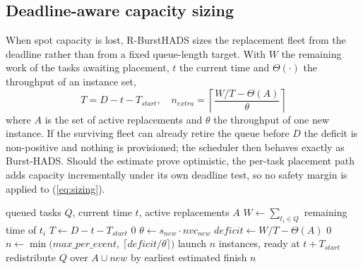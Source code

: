 \documentclass[conference]{IEEEtran}
\begin{document}
\subsection{Deadline-aware capacity sizing}

When spot capacity is lost, R-BurstHADS sizes the replacement fleet from the
deadline rather than from a fixed queue-length target. With $W$ the remaining
work of the tasks awaiting placement, $t$ the current time and $\Theta(\cdot)$
the throughput of an instance set,
\begin{equation}
T = D - t - T_{\mathit{start}}, \quad
n_{\mathit{extra}} = \left\lceil \frac{W/T - \Theta(A)}{\theta} \right\rceil
\label{eq:sizing}
\end{equation}
where $A$ is the set of active replacements and $\theta$ the throughput of one
new instance. If the surviving fleet can already retire the queue before $D$
the deficit is non-positive and nothing is provisioned; the scheduler then
behaves exactly as Burst-HADS. Should the estimate prove optimistic, the
per-task placement path adds capacity incrementally under its own deadline
test, so no safety margin is applied to (\ref{eq:sizing}).

\begin{algorithm}[t]
\caption{\textsc{DeadlineAwareProvision} (Theorem 2)}
\label{alg:sizing}
\begin{algorithmic}[1]
\REQUIRE queued tasks $Q$, current time $t$, active replacements $A$
\STATE $W \leftarrow \sum_{t_i \in Q}$ remaining time of $t_i$
\STATE $T \leftarrow D - t - T_{\mathit{start}}$
 \RETURN $0$ \ENDIF
\STATE $\theta \leftarrow s_{\mathit{new}}\cdot \mathit{nvc}_{\mathit{new}}$
\STATE $\mathit{deficit} \leftarrow W/T - \Theta(A)$
 \RETURN $0$ \ENDIF
\STATE $n \leftarrow \min\!\big(\mathit{max\_per\_event},\ \lceil \mathit{deficit}/\theta \rceil\big)$
\STATE launch $n$ instances, ready at $t + T_{\mathit{start}}$
\STATE redistribute $Q$ over $A \cup \mathit{new}$ by earliest estimated finish
\RETURN $n$
\end{algorithmic}
\end{algorithm}
\end{document}
